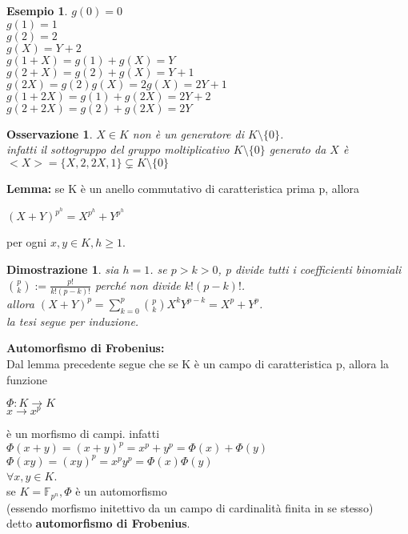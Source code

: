 \documentclass[a4paper,12pt]{article}
\theoremstyle{def}
\theoremstyle{prop}
\theoremstyle{esempio}
\newtheorem*{example}{Esempio}
\theoremstyle{dimostrazione}
\newtheorem*{dimostrazione}{Dimostrazione}
\theoremstyle{teo}
\theoremstyle{osservazione}
\newtheorem*{osservazione}{Osservazione}
\begin{document}
\begin{example}
	\(g(0) = 0\)\\
	\(g(1) = 1\)\\
	\(g(2) = 2\)\\
	\(g(X) = Y + 2\)\\
	\(g(1 + X) = g(1) + g(X) = Y\)\\
	\(g(2 + X) = g(2) + g(X) = Y + 1\)\\
	\(g(2X) = g(2)g(X) = 2g(X) = 2Y + 1\)\\
	\(g(1 + 2X) = g(1) + g(2X) = 2Y + 2\)\\
	\(g(2 + 2X) = g(2) + g(2X) = 2Y\)\\
\end{example}

\begin{osservazione}
	\(X \in K\) non è un generatore di \(K \setminus \{0\}\).\\
	infatti il sottogruppo del gruppo moltiplicativo \(K \setminus \{0\}\) generato da \(X\) è\\
	\(<X> = \{X, 2, 2X, 1\} \subsetneq K \setminus \{0\}\)\\
\end{osservazione}

\newpage

\textbf{Lemma:} se K è un anello commutativo di caratteristica prima p, allora
\begin{center}
	\((X + Y)^{p^h} = X^{p^h} + Y^{p^h}\)
\end{center}
per ogni \(x, y \in K, h \geq 1\).

\begin{dimostrazione}
	sia \(h = 1\). se \(p > k > 0\), p divide tutti i coefficienti binomiali\\
	\(\binom{p}{k} := \frac{p!}{k!(p-k)!}\) perché non divide \(k!(p-k)!\).\\
	allora \((X + Y)^p = \sum_{k=0}^{p} \binom{p}{k} X^k Y^{p-k} = X^p + Y^p\).\\
	la tesi segue per induzione.\\
\end{dimostrazione}

\textbf{Automorfismo di Frobenius:}\\
Dal lemma precedente segue che se K è un campo di caratteristica p, allora la funzione
\begin{center}
	\(\Phi : K \rightarrow K\)\\
	\(x \rightarrow x^p\)
\end{center}
è un morfismo di campi. infatti\\
\(\Phi(x + y) = (x + y)^p = x^p + y^p = \Phi(x) + \Phi(y)\)\\
\(\Phi(xy) = (xy)^p = x^p y^p = \Phi(x) \Phi(y)\)\\
\(\forall x,y \in K\).\\
se \(K = \mathbb{F}_{p^n}, \Phi\) è un automorfismo\\
(essendo morfismo initettivo da un campo di cardinalità finita in se stesso)\\
detto \textbf{automorfismo di Frobenius}.
\end{document}
